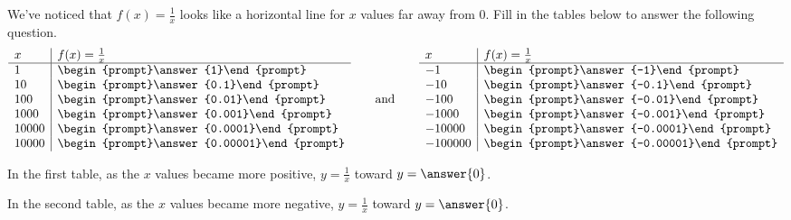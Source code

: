 \documentclass{ximera}
\begin{document}
\begin{problem}
We've noticed that $f(x) = \frac{1}{x}$ looks like a horizontal line for $x$ values far away from $0$.  Fill in the tables below to answer the following question. 
  \[
  \begin{array}{l|l}
    x      & f(x) = \frac{1}{x}     \\ \hline
    1    & \begin{prompt}\answer{1}\end{prompt}\\
    10   & \begin{prompt}\answer{0.1}\end{prompt}\\
    100  & \begin{prompt}\answer{0.01}\end{prompt}\\
    1000 & \begin{prompt}\answer{0.001}\end{prompt} \\
    10000 & \begin{prompt}\answer{0.0001}\end{prompt} \\
    10000 & \begin{prompt}\answer{0.00001}\end{prompt} \\
  \end{array}
  \qquad\text{and}\qquad
  \begin{array}{l|l}
     x      & f(x) = \frac{1}{x}     \\ \hline
    -1    & \begin{prompt}\answer{-1}\end{prompt}\\
    -10   & \begin{prompt}\answer{-0.1}\end{prompt}\\
    -100  & \begin{prompt}\answer{-0.01}\end{prompt}\\
    -1000 & \begin{prompt}\answer{-0.001}\end{prompt} \\
    -10000 & \begin{prompt}\answer{-0.0001}\end{prompt} \\
    -100000 & \begin{prompt}\answer{-0.00001}\end{prompt} \\
    \end{array}
  \]
  
In the first table, as the $x$ values became more positive, $y = \frac{1}{x}$  toward $y = \answer{0}$.  

In the second table, as the $x$ values became more negative, $y = \frac{1}{x}$  toward $y = \answer{0}$. 

\end{problem}
\end{document}
